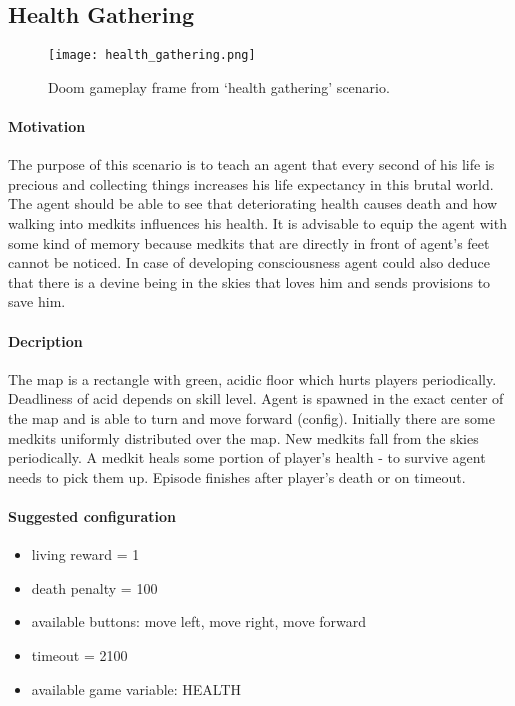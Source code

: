 	\subsection{Health Gathering}
		\begin{figure}
			\centering
			\texttt{[image: health\_gathering.png]}
			\caption{Doom gameplay frame from `health gathering' scenario.}\label{fig:health_gathering}
		\end{figure}
		\paragraph{Motivation}
			The purpose of this scenario is to teach an agent that every second of his life is precious and collecting things increases his life expectancy in this brutal world. The agent should be able to see that deteriorating health causes death and how walking into medkits influences his health. It is advisable to equip the agent with some kind of memory because medkits that are directly in front of agent's feet cannot be noticed. In case of developing consciousness agent could also deduce that there is a devine being in the skies that loves him and sends provisions to save him.

		\paragraph{Decription}
			The map is a rectangle with green, acidic floor which hurts players periodically. Deadliness of acid depends on skill level. Agent is spawned in the exact center of the map and is able to turn and move forward (config).  Initially there are some medkits uniformly distributed over the map. New medkits fall from the skies periodically. A medkit heals some portion of player's health - to survive agent needs to pick them up. Episode finishes after player's death or on timeout.

		\paragraph{Suggested configuration}
		\begin{itemize}
			\item living reward = 1
			\item death penalty = 100
			\item available buttons: move left, move right, move forward
			\item timeout = 2100
			\item available game variable: HEALTH
		\end{itemize}
	\newpage

